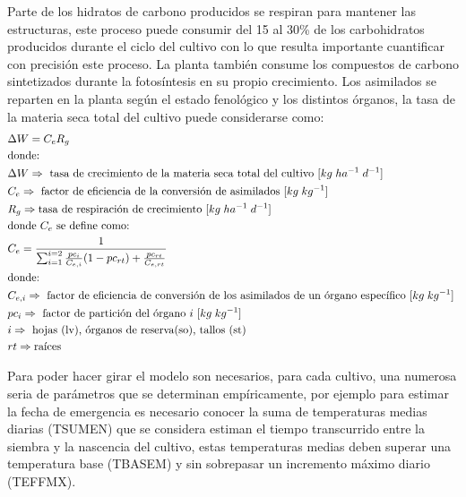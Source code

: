 \begin{enumerate}
	Parte de los hidratos de carbono producidos se respiran para mantener las estructuras, este proceso puede consumir del 15 al 30\% de los carbohidratos producidos durante el ciclo del cultivo con lo que resulta importante cuantificar con precisión este proceso. La planta también consume los compuestos de carbono sintetizados durante la fotosíntesis en su propio crecimiento. Los asimilados se reparten en la planta según el estado fenológico y los distintos órganos, la tasa de la materia seca total del cultivo puede considerarse como:
	\begin{align*}
		&\Delta W = C_e R_g\\
		&\text{donde: } \\
		&\Delta W  \Rightarrow \text{ tasa de crecimiento de la materia seca total del cultivo [$ kg \; ha^{-1} \; d^{-1} $] } \\
		&C_e  \Rightarrow \text{ factor de eficiencia de la conversión de asimilados [$ kg \; kg^{-1} $] } \\
		&R_g \Rightarrow \text{tasa de respiración de crecimiento [$ kg \; ha^{-1} \; d^{-1} $] } \\
		&\text{donde $ C_e $ se define como: } \\ 
		&C_e = \frac{1}{\sum_{i=1}^{i=2}\frac{pc_i}{C_{e,i}}(1-pc_{rt})+\frac{pc_{rt}}{C_{e,rt}} } \\
		&\text{donde: } \\
		& C_{e,i}  \Rightarrow \text{ factor de eficiencia de conversión de los asimilados de un órgano específico [$ kg \; kg^{-1} $] } \\
		& pc_i  \Rightarrow \text{ factor de partición del órgano $ i $ [$ kg \; kg^{-1} $] } \\
		& i \Rightarrow \text{ hojas (lv), órganos de reserva(so), tallos (st) } \\
		& rt \Rightarrow \text{raíces}
	\end{align*}
	
	Para poder hacer girar el modelo son necesarios, para cada cultivo, una numerosa seria de parámetros que se determinan empíricamente, por ejemplo para estimar la fecha de emergencia es necesario conocer la suma de temperaturas medias diarias (TSUMEN) que se considera estiman el tiempo transcurrido entre la siembra y la nascencia del cultivo, estas temperaturas medias deben superar una temperatura base (TBASEM) y sin sobrepasar un incremento máximo diario (TEFFMX). 
	
\end{enumerate}


